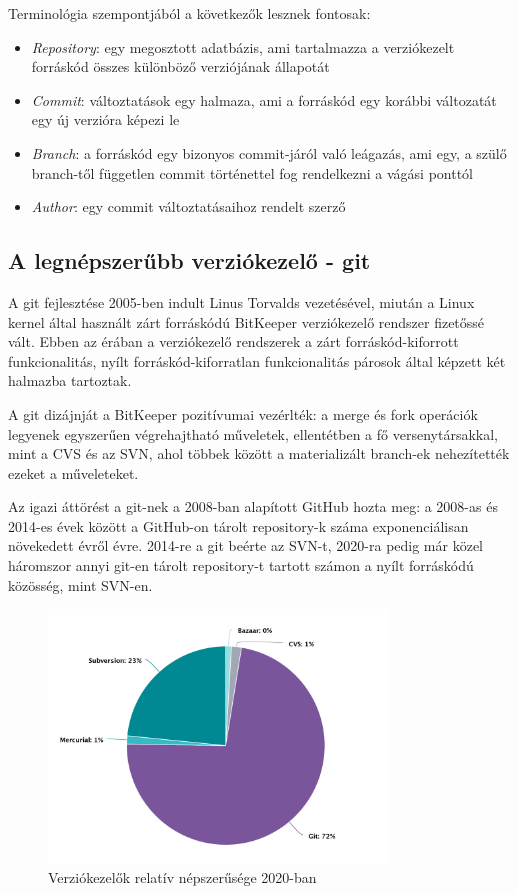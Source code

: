Terminológia szempontjából a következők lesznek fontosak:
\begin{itemize}
    \item \textit{Repository}: egy megosztott adatbázis, ami tartalmazza a verziókezelt forráskód összes különböző verziójának állapotát
    \item \textit{Commit}: változtatások egy halmaza, ami a forráskód egy korábbi változatát egy új verzióra képezi le
    \item \textit{Branch}: a forráskód egy bizonyos commit-járól való leágazás, ami egy, a szülő branch-től független commit történettel fog rendelkezni a vágási ponttól
    \item \textit{Author}: egy commit változtatásaihoz rendelt szerző
\end{itemize}

\subsection{A legnépszerűbb verziókezelő - git}\label{section:git}

A git fejlesztése 2005-ben indult Linus Torvalds vezetésével, miután a Linux kernel által használt zárt forráskódú BitKeeper verziókezelő rendszer fizetőssé vált. Ebben az érában a verziókezelő rendszerek a zárt forráskód-kiforrott funkcionalitás, nyílt forráskód-kiforratlan funkcionalitás párosok által képzett két halmazba tartoztak.

A git dizájnját a BitKeeper pozitívumai vezérlték: a merge és fork operációk legyenek egyszerűen végrehajtható műveletek, ellentétben a fő versenytársakkal, mint a CVS és az SVN, ahol többek között a materializált branch-ek nehezítették ezeket a műveleteket.

Az igazi áttörést a git-nek a 2008-ban alapított GitHub hozta meg: a 2008-as és 2014-es évek között a GitHub-on tárolt repository-k száma exponenciálisan növekedett évről évre. 2014-re a git beérte az SVN-t, 2020-ra pedig már közel háromszor annyi git-en tárolt repository-t tartott számon a nyílt forráskódú közösség, mint SVN-en.

\begin{figure}[H]
    \centering
    \includegraphics[width=0.8\textwidth]{images/gitMarketShare.png}
    \caption{Verziókezelők relatív népszerűsége 2020-ban}
    \label{fig:version-controls}
\end{figure}

